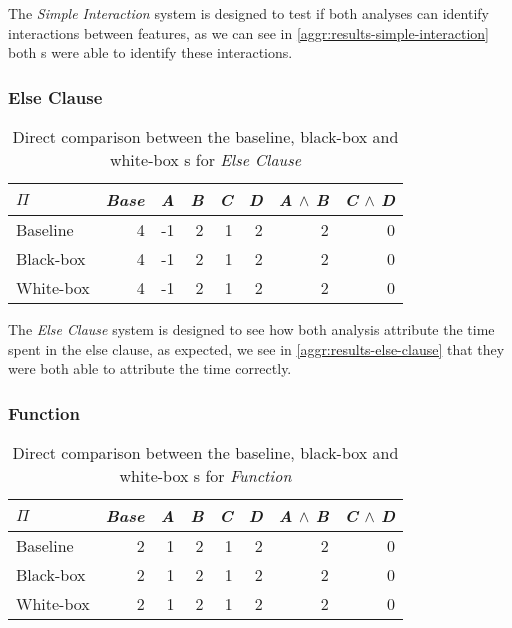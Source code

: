 The \emph{Simple Interaction} system is designed to test if both analyses can identify interactions between features, 
as we can see in \autoref{aggr:results-simple-interaction} both {\perfInfluenceModel}s were able to identify these interactions.

\subsubsection*{Else Clause}

\begin{table}[H]
    \centering
    \begin{tabular}{lrrrrrrr}
    \toprule
    $\Pi$    & \emph{Base} & \emph{A} & \emph{B} & \emph{C} & \emph{D} & \emph{A} $\land$ \emph{B} & \emph{C} $\land$ \emph{D}  \\ \midrule
    Baseline & 4    & -1 & 2 & 1 & 2 & 2           & 0            \\
    Black-box & 4    & -1 & 2 & 1 & 2 & 2           & 0           \\
    White-box & 4    & -1 & 2 & 1 & 2 & 2           & 0           \\ \bottomrule
    \end{tabular}  
    \caption{Direct comparison between the baseline, black-box and white-box {\perfInfluenceModel}s for \emph{Else Clause}}\label{aggr:results-else-clause}
\end{table}

The \emph{Else Clause} system is designed to see how both analysis attribute the time spent in the else clause, as expected, we see in
\autoref{aggr:results-else-clause} that they were both able to attribute the time correctly.

\subsubsection*{Function}

\begin{table}[H]
    \centering
    \begin{tabular}{lrrrrrrr}
    \toprule
    $\Pi$    & \emph{Base} & \emph{A} & \emph{B} & \emph{C} & \emph{D} & \emph{A} $\land$ \emph{B} & \emph{C} $\land$ \emph{D}  \\ \midrule
    Baseline & 2    & 1 & 2 & 1 & 2 & 2           & 0            \\
    Black-box & 2   & 1 & 2 & 1 & 2 & 2           & 0            \\
    White-box & 2   & 1 & 2 & 1 & 2 & 2           & 0            \\ \bottomrule
    \end{tabular}  
    \caption{Direct comparison between the baseline, black-box and white-box {\perfInfluenceModel}s for \emph{Function}}\label{aggr:results-function}
\end{table}


